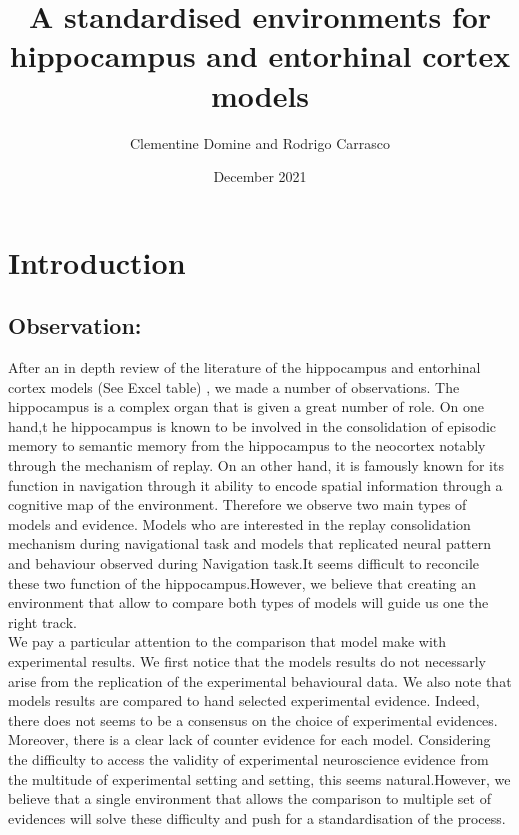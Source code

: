 \documentclass{article}
\title{A standardised environments for hippocampus and entorhinal cortex models}
\author{Clementine Domine and Rodrigo Carrasco}
\date{December 2021}
\begin{document}
\maketitle
\tableofcontents
\section{Introduction}
\subsection{Observation:}

After an in depth review of the literature of the hippocampus and entorhinal cortex models (See Excel table) , we made a number of observations.
The hippocampus is a complex organ that is given a great number of role. On one hand,t he hippocampus is known to be involved in the  consolidation of episodic memory to semantic memory from the hippocampus to the neocortex notably through the mechanism of replay.
On an other hand, it is famously known for its function in navigation through it ability to encode spatial information through a cognitive map of the environment.
Therefore we observe two main types of models and evidence. 
Models who are interested in the replay consolidation mechanism  during navigational task and models that replicated neural pattern and behaviour observed during Navigation task.It seems difficult to reconcile these two function of the hippocampus.However, we believe that creating an environment that allow to compare both types of models will guide us one the right track. \\



We pay a particular attention to the comparison that model make with experimental results. We first notice that the models results do not necessarly arise from the replication of the experimental behavioural data. We also note that models  results are compared to hand selected experimental evidence.
Indeed, there does not seems to be a consensus on the choice of experimental evidences. Moreover, there is a clear lack of counter evidence for each model. Considering the difficulty to access the validity of experimental neuroscience evidence from the multitude of experimental setting and setting, this seems natural.However, we believe that a single environment that allows the comparison to multiple set of evidences will solve these difficulty and push for a standardisation of the process. \\ 
\end{document}
